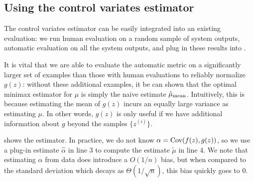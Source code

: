 


\subsection{Using the control variates estimator}
The control variates estimator can be easily integrated into an existing evaluation:
we run human evaluation on a random sample of system outputs, automatic evaluation on all the system outputs, and plug in these results into .

It is vital that we are able to evaluate the automatic metric on a significantly larger set of examples than those with human evaluations to reliably normalize $g(z)$:
without these additional examples, it be can shown that the optimal minimax estimator for $\mu$ is simply the naive estimate $\hat \mu_\text{mean}$.
Intuitively, this is because estimating the mean of $g(z)$ incurs an equally large variance as estimating $\mu$.
In other words, $g(z)$ is only useful if we have additional information about $g$ beyond the samples $\{z^{(i)}\}$.

 shows the estimator.
In practice, we do not know $\alpha = \operatorname{Cov}(f(z),g(z))$, so we use a plug-in estimate $\hat{\alpha}$ in line 3 to compute the estimate $\widetilde{\mu}$ in line 4.
We note that estimating $\alpha$ from data does introduce a $O(1/n)$ bias,
but when compared to the standard deviation which decays as $\Theta(1/\sqrt{n})$, this bias quickly goes to $0$.

